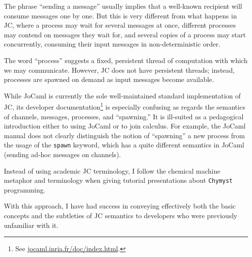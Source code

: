 \documentclass[sigplan,10pt]{acmart}\settopmatter{}
\begin{document}
The phrase \textquotedblleft sending a message\textquotedblright{}
usually implies that a well-known recipient will consume messages
one by one. But this is very different from what happens in JC, where
a process may wait for several messages at once, different processes
may contend on messages they wait for, and several copies of a process
may start concurrently, consuming their input messages in non-deterministic
order.

The word ``process'' suggests a fixed, persistent thread of computation
with which we may communicate. However, JC does not have persistent
threads; instead, processes are spawned on demand as
input messages become available.

While JoCaml is currently the sole well-maintained standard implementation
of JC, its developer documentation\footnote{ See \href{http://jocaml.inria.fr/doc/index.html}{jocaml.inria.fr/doc/index.html}.}
is especially confusing as regards the semantics of channels, messages,
processes, and ``spawning.'' It is ill-suited as a pedagogical introduction
either to using JoCaml or to join calculus. For example, the JoCaml
manual does not clearly distinguish the notion of ``spawning'' a
new process from the usage of the \texttt{spawn} keyword, which has
a quite different semantics in JoCaml (sending ad-hoc messages on
channels).

Instead of using academic JC terminology, I follow the chemical machine
metaphor and terminology when giving tutorial presentations about
\texttt{Chymyst} programming. %
\begin{comment}
Here is a dictionary:
\begin{center}
\begin{tabular}{|c|c|c|}
\hline 
Academic join calculus & Chemical machine & \texttt{Chymyst} code example\tabularnewline
\hline 
\hline 
message on a channel & input molecule & \texttt{case a(123)} $\Rightarrow$ ...\tabularnewline
\hline 
channel or name & molecule emitter & \texttt{val a: M{[}Int{]}}\tabularnewline
\hline 
synchronous channel & blocking emitter & \texttt{val q: B{[}Unit, Int{]}}\tabularnewline
\hline 
process & reaction & \texttt{go \{ case a(x) + }...\texttt{ }$\Rightarrow$\texttt{ }...\texttt{ \}}\tabularnewline
\hline 
sending a message & emitting a molecule & \texttt{a(123)}\tabularnewline
\hline 
sending a synchronous message & emitting a blocking molecule & \texttt{val x: Int = q()}\tabularnewline
\hline 
join definition & reaction site & \texttt{site(r1, r2, ...)}\tabularnewline
\hline 
\end{tabular}
\par\end{center}
\end{comment}
With this approach, I have had success in conveying effectively both
the basic concepts and the subtleties of JC semantics to developers
who were previously unfamiliar with it.
\end{document}
